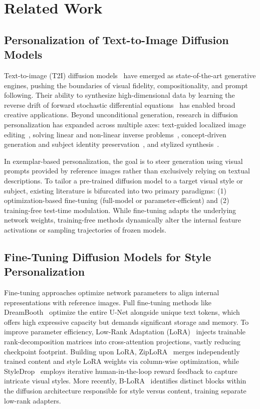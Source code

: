\section{Related Work}
\label{sec:related}

\subsection{Personalization of Text-to-Image Diffusion Models}
Text-to-image (T2I) diffusion models~\cite{ddpm,sd,wuerstchen} have emerged as state-of-the-art generative engines, pushing the boundaries of visual fidelity, compositionality, and prompt following. Their ability to synthesize high-dimensional data by learning the reverse drift of forward stochastic differential equations~\cite{songscore} has enabled broad creative applications. Beyond unconditional generation, research in diffusion personalization has expanded across multiple axes: text-guided localized image editing~\cite{prompt2prompt,instructpix2pix}, solving linear and non-linear inverse problems~\cite{dps}, concept-driven generation and subject identity preservation~\cite{dreambooth,lora}, and stylized synthesis~\cite{stylealigned,instantstyle,rout2025rbmodulation}. 

In exemplar-based personalization, the goal is to steer generation using visual prompts provided by reference images rather than exclusively relying on textual descriptions. To tailor a pre-trained diffusion model to a target visual style or subject, existing literature is bifurcated into two primary paradigms: (1) optimization-based fine-tuning (full-model or parameter-efficient) and (2) training-free test-time modulation. While fine-tuning adapts the underlying network weights, training-free methods dynamically alter the internal feature activations or sampling trajectories of frozen models.

\subsection{Fine-Tuning Diffusion Models for Style Personalization}
Fine-tuning approaches optimize network parameters to align internal representations with reference images. Full fine-tuning methods like DreamBooth~\cite{dreambooth} optimize the entire U-Net alongside unique text tokens, which offers high expressive capacity but demands significant storage and memory. To improve parameter efficiency, Low-Rank Adaptation (LoRA)~\cite{lora} injects trainable rank-decomposition matrices into cross-attention projections, vastly reducing checkpoint footprint. Building upon LoRA, ZipLoRA~\cite{ziplora} merges independently trained content and style LoRA weights via column-wise optimization, while StyleDrop~\cite{styledrop} employs iterative human-in-the-loop reward feedback to capture intricate visual styles. More recently, B-LoRA~\cite{b-lora} identifies distinct blocks within the diffusion architecture responsible for style versus content, training separate low-rank adapters. 

